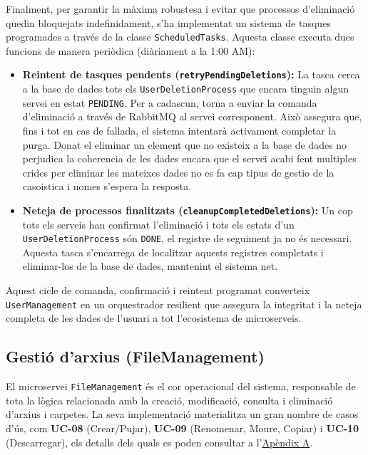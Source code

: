 Finalment, per garantir la màxima robustesa i evitar que processos d'eliminació quedin bloquejats indefinidament, s'ha implementat un sistema de tasques programades a través de la classe \texttt{ScheduledTasks}. Aquesta classe executa dues funcions de manera periòdica (diàriament a la 1:00 AM):
\begin{itemize}
    \item \textbf{Reintent de tasques pendents (\texttt{retryPendingDeletions}):} La tasca cerca a la base de dades tots els \texttt{UserDeletionProcess} que encara tinguin algun servei en estat \texttt{PENDING}. Per a cadascun, torna a enviar la comanda d'eliminació a través de RabbitMQ al servei corresponent. Això assegura que, fins i tot en cas de fallada, el sistema intentarà activament completar la purga. Donat el eliminar un element que no existeix a la base de dades no perjudica la coherencia de les dades encara que el servei acabi fent multiples crides per eliminar les mateixes dades no es fa cap tipus de gestio de la casoistica i nomes s'espera la resposta.
    \item \textbf{Neteja de processos finalitzats (\texttt{cleanupCompletedDeletions}):} Un cop tots els serveis han confirmat l'eliminació i tots els estats d'un \texttt{UserDeletionProcess} són \texttt{DONE}, el registre de seguiment ja no és necessari. Aquesta tasca s'encarrega de localitzar aquests registres completats i eliminar-los de la base de dades, mantenint el sistema net.
\end{itemize}
Aquest cicle de comanda, confirmació i reintent programat converteix \texttt{UserManagement} en un orquestrador resilient que assegura la integritat i la neteja completa de les dades de l'usuari a tot l'ecosistema de microserveis.


\subsection{Gestió d'arxius (FileManagement)}

El microservei \texttt{FileManagement} és el cor operacional del sistema, responsable de tota la lògica relacionada amb la creació, modificació, consulta i eliminació d'arxius i carpetes. La seva implementació materialitza un gran nombre de casos d'ús, com \textbf{UC-08} (Crear/Pujar), \textbf{UC-09} (Renomenar, Moure, Copiar) i \textbf{UC-10} (Descarregar), els detalls dels quals es poden consultar a l'\hyperref[app:casos_us]{Apèndix A}.

